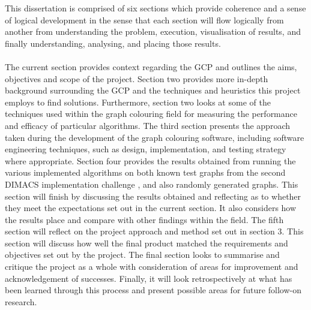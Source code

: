 This dissertation is comprised of six sections which provide coherence and a sense of logical development in the sense that each section will flow logically from another from understanding the problem, execution, visualisation of results, and finally understanding, analysing, and placing those results. 
\\\\
The current section provides context regarding the GCP and outlines the aims, objectives and scope of the project. Section two provides more in-depth background surrounding the GCP and the techniques and heuristics this project employs to find solutions. Furthermore, section two looks at some of the techniques used within the graph colouring field for measuring the performance and efficacy of particular algorithms. The third section presents the approach taken during the development of the graph colouring software, including software engineering techniques, such as design, implementation, and testing strategy where appropriate. Section four provides the results obtained from running the various implemented algorithms on both known test graphs from the second DIMACS implementation challenge \cite{DIMACSChallenge2}, and also randomly generated graphs. This section will finish by discussing the results obtained and reflecting as to whether they meet the expectations set out in the current section. It also considers how the results place and compare with other findings within the field. The fifth section will reflect on the project approach and method set out in section 3. This section will discuss how well the final product matched the requirements and objectives set out by the project. The final section looks to summarise and critique the project as a whole with consideration of areas for improvement and acknowledgement of successes. Finally, it will look retrospectively at what has been learned through this process and present possible areas for future follow-on research. 
